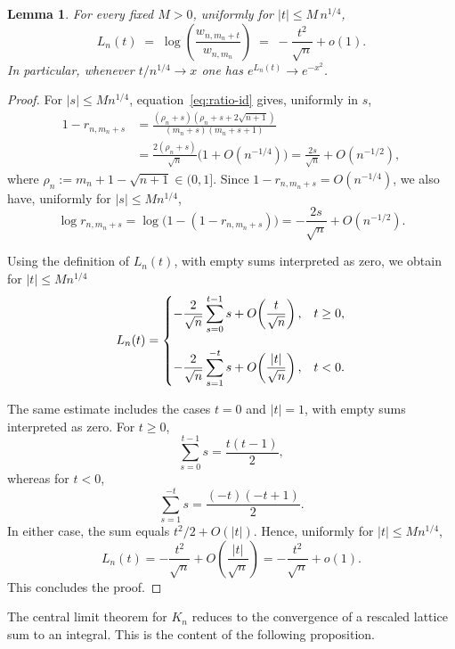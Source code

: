 \documentclass[english,11pt]{smfart}
\newtheorem{lemma}[theorem]{Lemma}
\numberwithin{equation}{section}
\begin{document}
\begin{lemma}\label{le:asymptotic_estimate_L_n(t)}
For every fixed $M>0$, uniformly for $|t|\le M\,n^{1/4}$,
\[
  L_n(t)\;=\;\log\left(\frac{w_{n,m_n+t}}{w_{n,m_n}}\right)\;=\;-\frac{t^{2}}{\sqrt n}+o(1).
\]
In particular, whenever $t/n^{1/4}\to x$ one has $e^{L_n(t)}\to e^{-x^{2}}$.
\end{lemma}
\begin{proof}
For $|s|\le M n^{1/4}$, equation~\eqref{eq:ratio-id} gives, uniformly in $s$,
\begin{align*}
1-r_{n,m_n+s}
&=\frac{(\rho_n+s)(\rho_n+s+2\sqrt{n+1})}{(m_n+s)(m_n+s+1)}  \\
&=\frac{2(\rho_n+s)}{\sqrt n}\bigl(1+O(n^{-1/4})\bigr)
 =\frac{2s}{\sqrt n}+O(n^{-1/2}),
\end{align*}
where $\rho_n:=m_n+1-\sqrt{n+1}\in(0,1]$. Since
$1-r_{n,m_n+s}=O(n^{-1/4})$, we also have, uniformly for
$|s|\le M n^{1/4}$,
\[
\log r_{n,m_n+s}
=
\log\bigl(1-(1-r_{n,m_n+s})\bigr)
=
-\frac{2s}{\sqrt n}+O(n^{-1/2}).
\]

Using the definition of $L_n(t)$, with empty sums interpreted as zero, we obtain for
$|t|\le M n^{1/4}$
\[
L_n(t)
=
\begin{dcases}
\displaystyle
-\frac{2}{\sqrt n}\sum_{s=0}^{t-1}s
+O\!\left(\frac{t}{\sqrt n}\right),
& t\ge0,\\[2ex]
\displaystyle
-\frac{2}{\sqrt n}\sum_{s=1}^{-t}s
+O\!\left(\frac{|t|}{\sqrt n}\right),
& t<0.
\end{dcases}
\]
\smallskip

The same estimate includes the cases $t=0$ and $|t|=1$, with empty sums
interpreted as zero. For $t\ge0$,
\[
\sum_{s=0}^{t-1}s=\frac{t(t-1)}2,
\]
whereas for $t<0$,
\[
\sum_{s=1}^{-t}s=\frac{(-t)(-t+1)}2.
\]
In either case, the sum equals $t^2/2+O(|t|)$. Hence, uniformly for
$|t|\le M n^{1/4}$,
\[
L_n(t)
=
-\frac{t^2}{\sqrt n}
+O\!\left(\frac{|t|}{\sqrt n}\right)
=
-\frac{t^2}{\sqrt n}+o(1).
\]
This concludes the proof.
\end{proof}

 The central limit theorem for $K_n$ reduces to the convergence of a rescaled lattice sum to an integral. This is the  content of the following proposition. 
\end{document}
